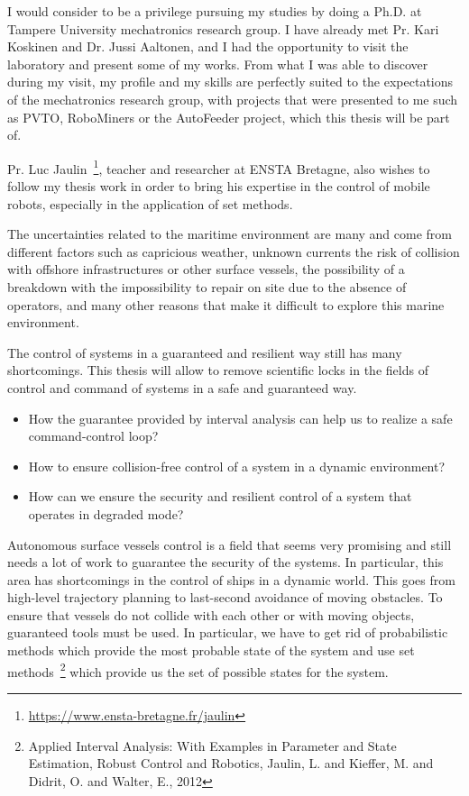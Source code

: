\documentclass[11pt, a4paper]{awesome-cv}
\begin{document}
\begin{cvletter}
		
			I would consider to be a privilege pursuing my studies by doing a Ph.D. at Tampere University mechatronics research group. I have already met Pr. Kari Koskinen and Dr. Jussi Aaltonen, and I had the opportunity to visit the laboratory and present some of my works. From what I was able to discover during my visit, my profile and my skills are perfectly suited to the expectations of the mechatronics research group, with projects that were presented to me such as PVTO, RoboMiners or the AutoFeeder project, which this thesis will be part of.

			Pr. Luc Jaulin~\footnote{\url{https://www.ensta-bretagne.fr/jaulin}}, teacher and researcher at ENSTA Bretagne, also wishes to follow my thesis work in order to bring his expertise in the control of mobile robots, especially in the application of set methods. 
			

			The uncertainties related to the maritime environment are many and come from different factors such as capricious weather, unknown currents the risk of collision with offshore infrastructures or other surface vessels, the possibility of a breakdown with the impossibility to repair on site due to the absence of operators, and many other reasons that make it difficult to explore this marine environment.

			The control of systems in a guaranteed and resilient way still has many shortcomings. This thesis will allow to remove scientific locks in the fields of control and command of systems in a safe and guaranteed way.

			\begin{itemize}[noitemsep,topsep=0pt,parsep=0pt,partopsep=0pt]
				\item How the guarantee provided by interval analysis can help us to realize a safe command-control loop?
				\item How to ensure collision-free control of a system in a dynamic environment?
				\item How can we ensure the security and resilient control of a system that operates in degraded mode?
			\end{itemize}


			Autonomous surface vessels control is a field that seems very promising and still needs a lot of work to guarantee the security of the systems. In particular, this area has shortcomings in the control of ships in a dynamic world. This goes from high-level trajectory planning to last-second avoidance of moving obstacles. To ensure that vessels do not collide with each other or with moving objects, guaranteed tools must be used. In particular, we have to get rid of probabilistic methods which provide the most probable state of the system and use set methods~\footnote{Applied Interval Analysis: With Examples in Parameter and State Estimation, Robust Control and Robotics, Jaulin, L. and Kieffer, M. and Didrit, O. and Walter, E., 2012} which provide us the set of possible states for the system. 


\end{cvletter}
\end{document}
